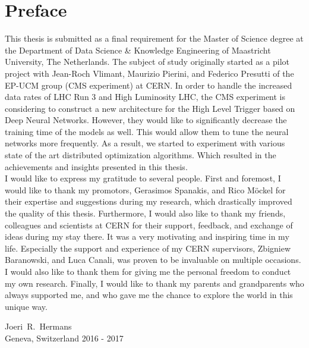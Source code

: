 %
%
%

\newpage
\chapter*{Preface}

This thesis is submitted as a final requirement for the Master of Science degree at the Department of Data Science \& Knowledge Engineering of Maastricht University, The Netherlands. The subject of study originally started as a pilot project with Jean-Roch Vlimant, Maurizio Pierini, and Federico Presutti of the EP-UCM group (CMS experiment) at CERN. In order to handle the increased data rates of LHC Run 3 and High Luminosity LHC, the CMS experiment is considering to construct a new architecture for the High Level Trigger based on Deep Neural Networks. However, they would like to significantly decrease the training time of the models as well. This would allow them to tune the neural networks more frequently. As a result, we started to experiment with various state of the art distributed optimization algorithms. Which resulted in the achievements and insights presented in this thesis.\\

I would like to express my gratitude to several people. First and foremost, I would like to thank my promotors, Gerasimos Spanakis, and Rico M\"ockel for their expertise and suggestions during my research, which drastically improved the quality of this thesis. Furthermore, I would also like to thank my friends, colleagues and scientists at CERN for their support, feedback, and exchange of ideas during my stay there. It was a very motivating and inspiring time in my life. Especially the support and experience of my CERN supervisors, Zbigniew Baranowski, and Luca Canali, was proven to be invaluable on multiple occasions. I would also like to thank them for giving me the personal freedom to conduct my own research. Finally, I would like to thank my parents and grandparents who always supported me, and who gave me the chance to explore the world in this unique way.

\vspace{1cm}
\begin{flushright}
Joeri~R.~Hermans\\
Geneva, Switzerland 2016 - 2017
\end{flushright}
